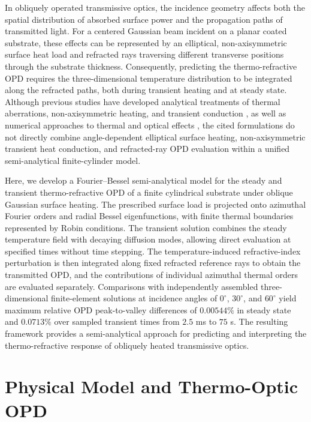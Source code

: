 \documentclass{optica-article}
\begin{document}
In obliquely operated transmissive optics, the incidence geometry affects both the spatial distribution of absorbed surface power and the propagation paths of transmitted light.
For a centered Gaussian beam incident on a planar coated substrate, these effects can be represented by an elliptical, non-axisymmetric surface heat load and refracted rays traversing different transverse positions through the substrate thickness.
Consequently, predicting the thermo-refractive OPD requires the three-dimensional temperature distribution to be integrated along the refracted paths, both during transient heating and at steady state.
Although previous studies have developed analytical treatments of thermal aberrations, non-axisymmetric heating, and transient conduction \cite{hellovinet1990,vinet2009,lee2015,kim2017,hellovinet1990transient,sabaeian2016}, as well as numerical approaches to thermal and optical effects \cite{kurcsics2025,borik1991}, the cited formulations do not directly combine angle-dependent elliptical surface heating, non-axisymmetric transient heat conduction, and refracted-ray OPD evaluation within a unified semi-analytical finite-cylinder model.

Here, we develop a Fourier--Bessel semi-analytical model for the steady and transient thermo-refractive OPD of a finite cylindrical substrate under oblique Gaussian surface heating.
The prescribed surface load is projected onto azimuthal Fourier orders and radial Bessel eigenfunctions, with finite thermal boundaries represented by Robin conditions.
The transient solution combines the steady temperature field with decaying diffusion modes, allowing direct evaluation at specified times without time stepping.
The temperature-induced refractive-index perturbation is then integrated along fixed refracted reference rays to obtain the transmitted OPD, and the contributions of individual azimuthal thermal orders are evaluated separately.
Comparisons with independently assembled three-dimensional finite-element solutions at incidence angles of $0^\circ$, $30^\circ$, and $60^\circ$ yield maximum relative OPD peak-to-valley differences of $0.00544\%$ in steady state and $0.0713\%$ over sampled transient times from $2.5$ ms to $75$ s.
The resulting framework provides a semi-analytical approach for predicting and interpreting the thermo-refractive response of obliquely heated transmissive optics.

\section{Physical Model and Thermo-Optic OPD}
\end{document}
